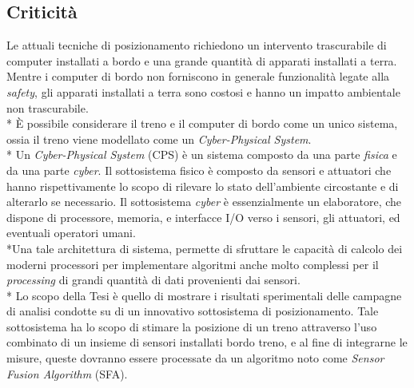 \subsection{Criticit\`a}
Le attuali tecniche di posizionamento richiedono un intervento trascurabile di computer installati a bordo e una grande quantit\`a di apparati installati a terra. Mentre i computer di bordo non forniscono in generale funzionalit\`a legate alla \emph{safety}, gli apparati installati a terra sono costosi e hanno un impatto ambientale non trascurabile.\\*
\`E possibile considerare il treno e il computer di bordo come un unico sistema, ossia il treno viene modellato come un \emph{Cyber-Physical System}.\\*
Un \emph{Cyber-Physical System} (CPS) \`e un sistema composto da una parte \emph{fisica} e da una parte \emph{cyber}. Il sottosistema fisico \`e composto da sensori e attuatori che hanno rispettivamente lo scopo di rilevare lo stato dell'ambiente circostante e di alterarlo se necessario. Il sottosistema \emph{cyber} \`e essenzialmente un elaboratore, che dispone di processore, memoria, e interfacce I/O verso i sensori, gli attuatori, ed eventuali operatori  umani. \cite{cps}\cite{cecca}\\*Una tale architettura di sistema, permette di sfruttare le capacit\`a di calcolo dei moderni processori per implementare algoritmi anche molto complessi per il \emph{processing} di grandi quantit\`a di dati provenienti dai sensori.\\*
Lo scopo della Tesi \`e quello di mostrare i risultati sperimentali delle campagne di analisi condotte su di un innovativo sottosistema di posizionamento. Tale sottosistema ha lo scopo di stimare la posizione di un treno attraverso l'uso combinato di un insieme di sensori installati bordo treno, e al fine di integrarne le misure, queste dovranno essere processate da un algoritmo noto come \emph{Sensor Fusion Algorithm} (SFA). \cite{sfarailway} 